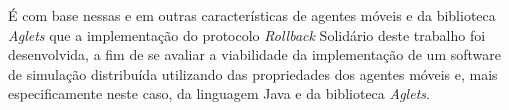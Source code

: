 	É com base nessas e em outras características de agentes móveis e da biblioteca \textit{Aglets} que a implementação do protocolo \textit{Rollback} Solidário deste trabalho foi desenvolvida, a fim de se avaliar a viabilidade da implementação de um software de simulação distribuída utilizando das propriedades dos agentes móveis e, mais especificamente neste caso, da linguagem Java e da biblioteca \textit{Aglets}.



